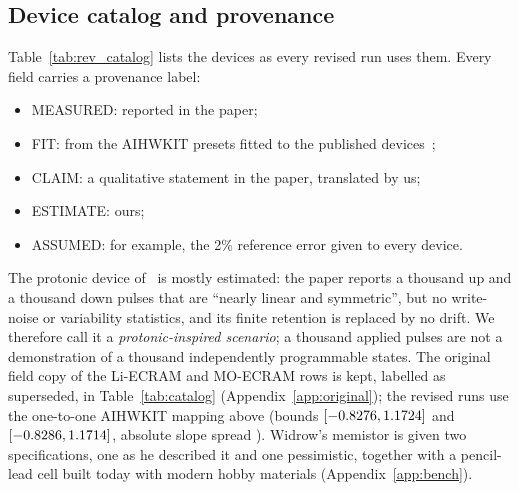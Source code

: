 \subsection{Device catalog and provenance}\label{sec:catalog}
Table~\ref{tab:rev_catalog} lists the devices as every revised run uses them. Every field carries a provenance label:
\begin{itemize}
\item MEASURED: reported in the paper;
\item FIT: from the AIHWKIT presets fitted to the published devices~\cite{rasch2021aihwkit};
\item CLAIM: a qualitative statement in the paper, translated by us;
\item ESTIMATE: ours;
\item ASSUMED: for example, the 2\% reference error given to every device.
\end{itemize}
The protonic device of~\cite{onen2022} is mostly estimated: the paper reports a thousand up and a thousand down pulses that are
``nearly linear and symmetric'', but no write-noise or variability statistics, and its finite retention is replaced by no
drift. We therefore call it a \emph{protonic-inspired scenario}; a thousand applied pulses are not a demonstration of a
thousand independently programmable states. The original field copy of the Li-ECRAM and MO-ECRAM
rows is kept, labelled as superseded, in Table~\ref{tab:catalog} (Appendix~\ref{app:original}); the revised runs use the one-to-one AIHWKIT mapping above (bounds $[-0.8276, 1.1724]$ and $[-0.8286, 1.1714]$,
absolute slope spread \RVliGammaDtod). Widrow's memistor is given two specifications,
one as he described it and one pessimistic, together with a pencil-lead cell built today with modern hobby materials
(Appendix~\ref{app:bench}).



